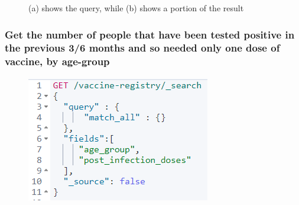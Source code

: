\documentclass{article}[IEEEtran]
\begin{document}
\begin{figure}[H]
\begin{center}
\begin{minipage}[b]{0.4\textwidth}
     \subcaption{}
  \end{minipage}
  \caption{(a) shows the query, while (b) shows a portion of the result}
\end{center}
\end{figure}

\subsubsection{Get the number of people that have been tested positive in the previous 3/6 months and so needed only one dose of vaccine, by age-group}\label{ssec:q9}


\begin{figure}[H]
\begin{center}
\begin{minipage}[b]{0.4\textwidth}
    \includegraphics[width=\textwidth, frame]{Query_9.PNG}
    \subcaption{}
  \end{minipage}
  \hfill
  \begin{minipage}[b]{0.4\textwidth}

\end{minipage}
\end{center}
\end{figure}
\end{document}
